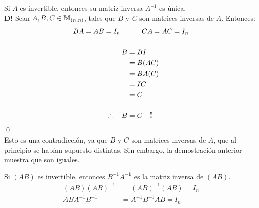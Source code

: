 \begin{note}
[
    La matriz inversa de la matriz inversa de una matriz $A$ es $A$:
    \begin{align*}
        (A^{-1})^{-1} = A
    \end{align*}
]
\end{note}

\begin{teorema}
{
    \label{thm:7}
    Si $A$ es invertible, entonces su matriz inversa $A^{-1}$ es única. \\

    \textbf{D!} Sean $A, B, C \in \mathbb{M}_{(n, n)}$, tales que $B$ y $C$ son matrices inversas de $A$. Entonces:
    \begin{align*}
        BA = AB = I_n \quad & \quad \quad CA = AC = I_n \\ \\
        B &= BI \\
        &= B(AC) \\
        &= BA(C) \\
        &= IC \\
        &= C \\ \\
        \therefore \quad B &= C \quad \text{\textbf{\large{!}}}
    \end{align*}\qed \\

    Esto es una contradicción, ya que $B$ y $C$ son matrices inversas de $A$, que al principio se habían supuesto distintas. Sin embargo, la demostración anterior muestra que son iguales.
}
\end{teorema}

\begin{teorema}
{
    \label{thm:8}
    Si $(AB)$ es invertible, entonces $B^{-1}A^{-1}$ es la matriz inversa de $(AB)$.
    \begin{align*}
        (AB)(AB)^{-1} &= (AB)^{-1}(AB) = I_n \\
        ABA^{-1}B^{-1} &= A^{-1}B^{-1}AB = I_n \\
    \end{align*}
}
\end{teorema}